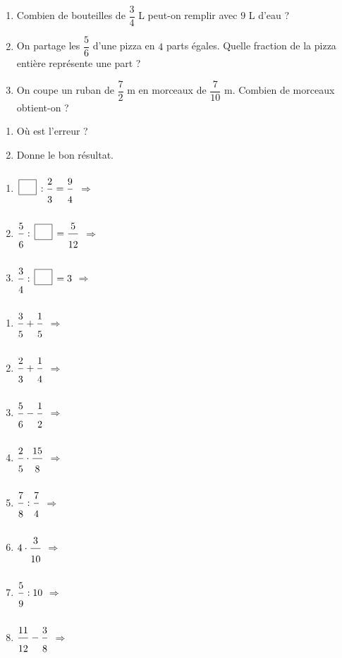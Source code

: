 \bigskip
{}
 
\begin{enumerate}[leftmargin=*,align=parleft, label=\alph*), itemsep=9pt]
\item Combien de bouteilles de $\dfrac{3}{4}$ L peut-on remplir avec $9$ L d'eau ?
\item On partage les $\dfrac{5}{6}$ d'une pizza en $4$ parts égales. Quelle fraction de la pizza entière représente une part ?
\item On coupe un ruban de $\dfrac{7}{2}$ m en morceaux de $\dfrac{7}{10}$ m. Combien de morceaux obtient-on ?
\end{enumerate}
 
\bigskip
{}
 
\begin{enumerate}[leftmargin=*,align=parleft, label=\alph*), itemsep=9pt]
\item Où est l'erreur ?
\item Donne le bon résultat.
\end{enumerate}
 
\bigskip
{}
 
\begin{enumerate}[leftmargin=*,align=parleft, label=\alph*), itemsep=9pt]
\item $\CaseC:\FA{2}{3}=\FA{9}{4}$ \quad $\Longrightarrow$
\item $\FA{5}{6}:\CaseC=\FA{5}{12}$ \quad $\Longrightarrow$
\item $\FA{3}{4}:\CaseC=3$ \quad $\Longrightarrow$
\end{enumerate}
 
\bigskip
\newpage
{}
 
\begin{enumerate}[leftmargin=*,align=parleft, label=\alph*), itemsep=9pt]
\item $\FA{3}{5}+\FA{1}{5}$ \quad $\Longrightarrow$
\item $\FA{2}{3}+\FA{1}{4}$ \quad $\Longrightarrow$
\item $\FA{5}{6}-\FA{1}{2}$ \quad $\Longrightarrow$
\item $\FA{2}{5}\cdot\FA{15}{8}$ \quad $\Longrightarrow$
\item $\FA{7}{8}:\FA{7}{4}$ \quad $\Longrightarrow$
\item $4\cdot\FA{3}{10}$ \quad $\Longrightarrow$
\item $\FA{5}{9}:10$ \quad $\Longrightarrow$
\item $\FA{11}{12}-\FA{3}{8}$ \quad $\Longrightarrow$
\end{enumerate}
 
